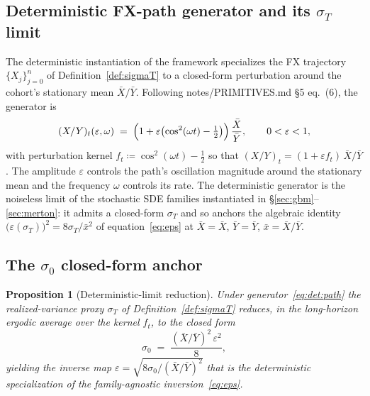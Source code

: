 \documentclass[11pt,letterpaper]{article}
\newtheorem{proposition}{Proposition}[section]
\newcommand{\sigmaT}{\sigma_{T}}
\newcommand{\epsT}{\varepsilon(\sigmaT)}
\newcommand{\Xbar}{\bar{X}}
\newcommand{\Ybar}{\bar{Y}}
\newcommand{\xbar}{\bar{x}}
\begin{document}
\subsection{Deterministic FX-path generator and its $\sigmaT$ limit}
\label{sec:det:generator}

The deterministic instantiation of the framework specializes the FX
trajectory $\{X_j\}_{j=0}^{n}$ of Definition~\ref{def:sigmaT} to a closed-form
perturbation around the cohort's stationary mean
$\Xbar/\Ybar$. Following \textsf{notes/PRIMITIVES.md} \S5 eq.~(6), the
generator is
\begin{equation}
    (X/Y)_t(\varepsilon, \omega)
    \;=\;
    \Bigl(1 + \varepsilon \bigl(\cos^{2}(\omega t) - \tfrac{1}{2}\bigr)\Bigr)
    \,\frac{\Xbar}{\Ybar},
    \qquad 0 < \varepsilon < 1,
    \label{eq:det:path}
\end{equation}
with perturbation kernel $f_t \coloneqq \cos^{2}(\omega t) - \tfrac{1}{2}$ so
that $(X/Y)_t = (1 + \varepsilon f_t)\,\Xbar/\Ybar$. The amplitude
$\varepsilon$ controls the path's oscillation magnitude around the
stationary mean and the frequency $\omega$ controls its rate. The
deterministic generator is the noiseless limit of the stochastic SDE
families instantiated in \S\ref{sec:gbm}--\ref{sec:merton}: it admits a
closed-form $\sigmaT$ and so anchors the algebraic identity
$\bigl(\epsT\bigr)^{2} = 8\sigmaT/\xbar^{2}$ of equation~\eqref{eq:eps}
at $\bar X = \Xbar$, $\bar Y = \Ybar$, $\xbar = \Xbar/\Ybar$.

\subsection{The $\sigma_{0}$ closed-form anchor}
\label{sec:det:sigma0}

\begin{proposition}[Deterministic-limit reduction]
\label{prop:sigma0}
Under generator~\eqref{eq:det:path} the realized-variance proxy
$\sigmaT$ of Definition~\ref{def:sigmaT} reduces, in the long-horizon
ergodic average over the kernel $f_t$, to the closed form
\begin{equation}
    \sigma_{0}
    \;=\;
    \frac{(\Xbar/\Ybar)^{2}\,\varepsilon^{2}}{8},
    \label{eq:det:sigma0}
\end{equation}
yielding the inverse map $\varepsilon = \sqrt{8\sigma_{0}/(\Xbar/\Ybar)^{2}}$
that is the deterministic specialization of the family-agnostic
inversion~\eqref{eq:eps}.
\end{proposition}
\end{document}

